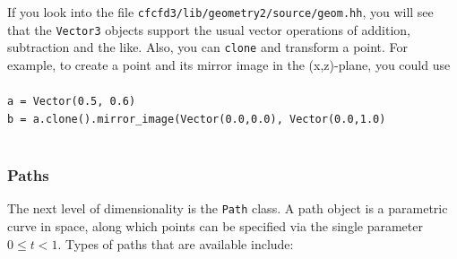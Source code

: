 \medskip
If you look into the file \texttt{cfcfd3/lib/geometry2/source/geom.hh}, you will see that
the \texttt{Vector3} objects support the usual vector operations of addition, subtraction and the like.
Also, you can \texttt{clone} and transform a point.
For example, to create a point and its mirror image in the (x,z)-plane, you could use\\
\topbar\\
\texttt{a = Vector(0.5, 0.6)}\\
\texttt{b = a.clone().mirror\_image(Vector(0.0,0.0), Vector(0.0,1.0)}\\
\bottombar\\
 
\subsubsection{Paths}
%
The next level of dimensionality is the \texttt{Path} class.
A path object is a parametric curve in space, 
along which points can be specified via the single parameter $0 \le t < 1$.
Types of paths that are available include:
